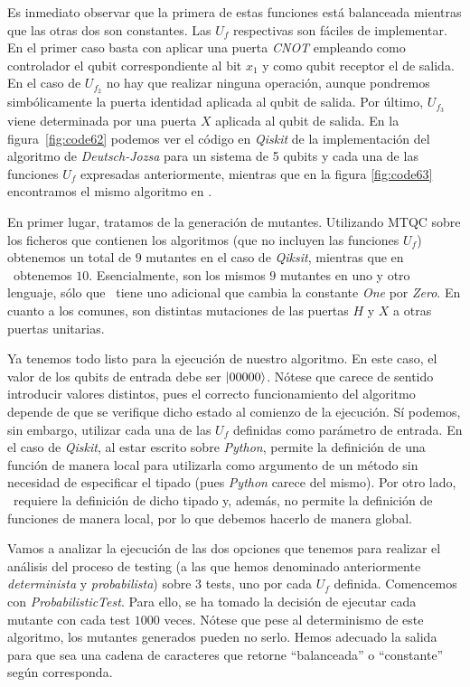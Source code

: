 Es inmediato observar que la primera de estas funciones está balanceada mientras que las otras dos son constantes.
%
Las $U_f$ respectivas son fáciles de implementar. En el primer caso basta con aplicar una puerta {\it CNOT} empleando como controlador el qubit correspondiente al bit $x_1$ y como qubit receptor el de salida. En el caso de $U_{f_2}$ no hay que realizar ninguna operación, aunque pondremos simbólicamente la puerta identidad aplicada al qubit de salida. Por último, $U_{f_3}$ viene determinada por una puerta $X$ aplicada al qubit de salida.
%
En la figura~\ref{fig:code62} podemos ver el código en \textit{Qiskit} de la implementación del algoritmo de \textit{Deutsch-Jozsa} para un sistema de 5 qubits y cada una de las funciones $U_f$ expresadas anteriormente, mientras que en la figura \ref{fig:code63} encontramos el mismo algoritmo en \qsh.

En primer lugar, tratamos de la generación de mutantes. Utilizando MTQC sobre los ficheros que contienen los algoritmos (que no incluyen las funciones $U_f$) obtenemos un total de $9$ mutantes en el caso de \textit{Qiksit}, mientras que en \qsh\ obtenemos $10$. Esencialmente, son los mismos $9$ mutantes en uno y otro lenguaje, sólo que \qsh\ tiene uno adicional que cambia la constante \textit{One} por \textit{Zero}. En cuanto a los comunes, son distintas mutaciones de las puertas $H$ y $X$ a otras puertas unitarias.

Ya tenemos todo listo para la ejecución de nuestro algoritmo. En este caso, el valor de los qubits de entrada debe ser $\left|00000\right\rangle$. Nótese que carece de sentido introducir valores distintos, pues el correcto funcionamiento del algoritmo depende de que se verifique dicho estado al comienzo de la ejecución.
%
Sí podemos, sin embargo, utilizar cada una de las $U_f$ definidas como parámetro de entrada. En el caso de \textit{Qiskit}, al estar escrito sobre \textit{Python}, permite la definición de una función de manera local para utilizarla como argumento de un método sin necesidad de especificar el tipado (pues \textit{Python} carece del mismo). Por otro lado, \qsh\ requiere la definición de dicho tipado y, además, no permite la definición de funciones de manera local, por lo que debemos hacerlo de manera global.

Vamos a analizar la ejecución de las dos opciones que tenemos para realizar el análisis del proceso de testing (a las que hemos denominado anteriormente {\it determinista} y {\it probabilista}) sobre $3$ tests, uno por cada $U_f$ definida. Comencemos con \textit{ProbabilisticTest}. Para ello, se ha tomado la decisión de ejecutar cada mutante con cada test $1000$ veces. Nótese que pese al determinismo de este algoritmo, los mutantes generados pueden no serlo. Hemos adecuado la salida para que sea una cadena de caracteres que retorne ``balanceada'' o ``constante'' según corresponda.

